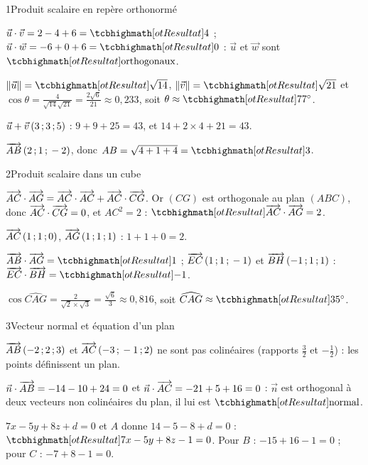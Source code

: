 

\begin{deuxcolonnes}

\begin{corrige}{1}{Produit scalaire en repère orthonormé}
\begin{questions}
  \item $\vec u\cdot\vec v=2-4+6=\res{4}$ ; $\vec u\cdot\vec w=-6+0+6=\res{0}$ : $\vec u$ et $\vec w$ sont
    $\res{\text{orthogonaux}}$.
  \item $\norme{\vec u}=\res{\sqrt{14}}$, $\norme{\vec v}=\res{\sqrt{21}}$ et\\
    $\cos\theta=\frac{4}{\sqrt{14}\sqrt{21}}=\frac{2\sqrt6}{21}\approx0{,}233$, soit $\theta\approx\res{77^\circ}$.
  \item $\vec u+\vec v\,(3\,{;}\,3\,{;}\,5)$ : $9+9+25=43$, et $14+2\times4+21=43$.
  \item $\overrightarrow{AB}\,(2\,{;}\,1\,{;}\,-2)$, donc $AB=\sqrt{4+1+4}=\res{3}$.
\end{questions}
\end{corrige}

\begin{corrige}{2}{Produit scalaire dans un cube}
\begin{questions}
  \item $\overrightarrow{AC}\cdot\overrightarrow{AG}=\overrightarrow{AC}\cdot\overrightarrow{AC}+\overrightarrow{AC}\cdot\overrightarrow{CG}$. Or $(CG)$ est orthogonale au plan $(ABC)$,
    donc $\overrightarrow{AC}\cdot\overrightarrow{CG}=0$, et $AC^2=2$ : $\res{\vect{AC}\cdot\vect{AG}=2}$.
  \item $\overrightarrow{AC}\,(1\,{;}\,1\,{;}\,0)$, $\overrightarrow{AG}\,(1\,{;}\,1\,{;}\,1)$ : $1+1+0=2$.
  \item $\vect{AB}\cdot\vect{AG}=\res{1}$ ; $\overrightarrow{EC}\,(1\,{;}\,1\,{;}\,-1)$ et $\overrightarrow{BH}\,(-1\,{;}\,1\,{;}\,1)$ : $\vect{EC}\cdot\vect{BH}=\res{-1}$.
  \item $\cos\widehat{CAG}=\frac{2}{\sqrt2\times\sqrt3}=\frac{\sqrt6}{3}\approx0{,}816$, soit $\widehat{CAG}\approx\res{35^\circ}$.
\end{questions}
\end{corrige}

\begin{corrige}{3}{Vecteur normal et équation d'un plan}
\begin{questions}
  \item $\overrightarrow{AB}\,(-2\,{;}\,2\,{;}\,3)$ et $\overrightarrow{AC}\,(-3\,{;}\,-1\,{;}\,2)$ ne sont pas colinéaires (rapports $\frac32$ et $-\frac12$) : les points
    définissent un plan.
  \item $\vec n\cdot\overrightarrow{AB}=-14-10+24=0$ et $\vec n\cdot\overrightarrow{AC}=-21+5+16=0$ : $\vec n$ est orthogonal à deux vecteurs non colinéaires
    du plan, il lui est $\res{\text{normal}}$.
  \item $7x-5y+8z+d=0$ et $A$ donne $14-5-8+d=0$ :\\ $\res{7x-5y+8z-1=0}$. Pour $B$ : $-15+16-1=0$ ; pour $C$ : $-7+8-1=0$.
\end{questions}
\end{corrige}


\end{deuxcolonnes}
